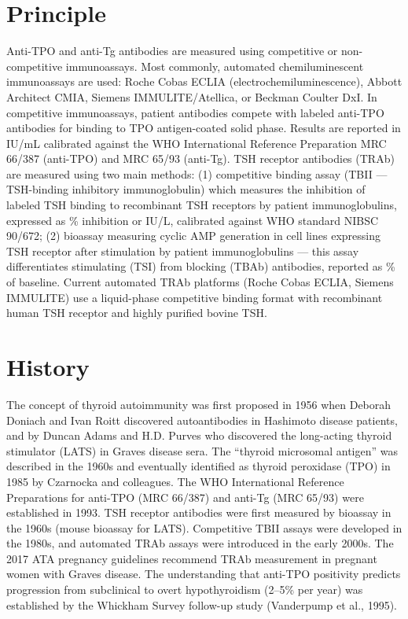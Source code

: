 \section*{Principle}
Anti-TPO and anti-Tg antibodies are measured using competitive or non-competitive immunoassays. Most commonly, automated chemiluminescent immunoassays are used: Roche Cobas ECLIA (electrochemiluminescence), Abbott Architect CMIA, Siemens IMMULITE/Atellica, or Beckman Coulter DxI. In competitive immunoassays, patient antibodies compete with labeled anti-TPO antibodies for binding to TPO antigen-coated solid phase. Results are reported in IU/mL calibrated against the WHO International Reference Preparation MRC 66/387 (anti-TPO) and MRC 65/93 (anti-Tg). TSH receptor antibodies (TRAb) are measured using two main methods: (1) competitive binding assay (TBII --- TSH-binding inhibitory immunoglobulin) which measures the inhibition of labeled TSH binding to recombinant TSH receptors by patient immunoglobulins, expressed as \% inhibition or IU/L, calibrated against WHO standard NIBSC 90/672; (2) bioassay measuring cyclic AMP generation in cell lines expressing TSH receptor after stimulation by patient immunoglobulins --- this assay differentiates stimulating (TSI) from blocking (TBAb) antibodies, reported as \% of baseline. Current automated TRAb platforms (Roche Cobas ECLIA, Siemens IMMULITE) use a liquid-phase competitive binding format with recombinant human TSH receptor and highly purified bovine TSH.

\section*{History}
The concept of thyroid autoimmunity was first proposed in 1956 when Deborah Doniach and Ivan Roitt discovered autoantibodies in Hashimoto disease patients, and by Duncan Adams and H.D. Purves who discovered the long-acting thyroid stimulator (LATS) in Graves disease sera. The ``thyroid microsomal antigen'' was described in the 1960s and eventually identified as thyroid peroxidase (TPO) in 1985 by Czarnocka and colleagues. The WHO International Reference Preparations for anti-TPO (MRC 66/387) and anti-Tg (MRC 65/93) were established in 1993. TSH receptor antibodies were first measured by bioassay in the 1960s (mouse bioassay for LATS). Competitive TBII assays were developed in the 1980s, and automated TRAb assays were introduced in the early 2000s. The 2017 ATA pregnancy guidelines recommend TRAb measurement in pregnant women with Graves disease. The understanding that anti-TPO positivity predicts progression from subclinical to overt hypothyroidism (2--5\% per year) was established by the Whickham Survey follow-up study (Vanderpump et al., 1995).

